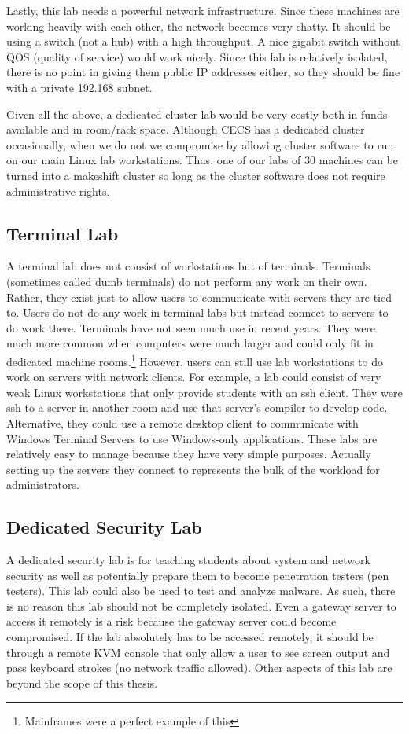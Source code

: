 Lastly, this lab needs a powerful network infrastructure.  Since these machines are working heavily with each other, the network becomes very chatty.  It should be using a switch (not a hub) with a high throughput.  A nice gigabit switch without QOS (quality of service) would work nicely.  Since this lab is relatively isolated, there is no point in giving them public IP addresses either, so they should be fine with a private 192.168 subnet.  

Given all the above, a dedicated cluster lab would be very costly both in funds available and in room/rack space.  Although CECS has a dedicated cluster occasionally, when we do not we compromise by allowing cluster software to run on our main Linux lab workstations.  Thus, one of our labs of 30 machines can be turned into a makeshift cluster so long as the cluster software does not require administrative rights.  
\subsection{Terminal Lab}
A terminal lab does not consist of workstations but of terminals.  Terminals (sometimes called dumb terminals) do not perform any work on their own.   Rather, they exist just to allow users to communicate with servers they are tied to.  Users do not do any work in terminal labs but instead connect to servers to do work there.  Terminals have not seen much use in recent years.  They were much more common when computers were much larger and could only fit in dedicated machine rooms.\footnote{Mainframes were a perfect example of this}  However, users can still use lab workstations to do work on servers with network clients.  For example, a lab could consist of very weak Linux workstations that only provide students with an ssh client.  They were ssh to a server in another room and use that server's compiler to develop code.  Alternative, they could use a remote desktop client to communicate with Windows Terminal Servers to use Windows-only applications.  These labs are relatively easy to manage because they have very simple purposes.  Actually setting up the servers they connect to represents the bulk of the workload for administrators.  
\subsection{Dedicated Security Lab}
A dedicated security lab is for teaching students about system and network security as well as potentially prepare them to become penetration testers (pen testers).  This lab could also be used to test and analyze malware.  As such, there is no reason this lab should not be completely isolated.  Even a gateway server to access it remotely is a risk because the gateway server could become compromised.  If the lab absolutely has to be accessed remotely, it should be through a remote KVM console that only allow a user to see screen output and pass keyboard strokes (no network traffic allowed).  Other aspects of this lab are beyond the scope of this thesis.  
